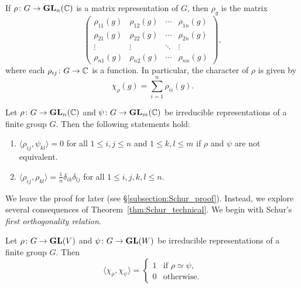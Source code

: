 If $\rho\colon G\to\mathbf{GL}_n(\mathbb{C})$ is a matrix representation of $G$, then
$\rho_g$ is the matrix
\[
\begin{pmatrix}
    \rho_{11}(g) & \rho_{12}(g) & \cdots & \rho_{1n}(g)\\
    \rho_{21}(g) & \rho_{22}(g) & \cdots & \rho_{2n}(g)\\
    \vdots & \vdots & \ddots & \vdots\\
    \rho_{n1}(g) & \rho_{n2}(g) & \cdots & \rho_{nn}(g)
\end{pmatrix},
\]
where each $\rho_{ij}\colon G\to\mathbb{C}$ is a function. 
In particular, the character of $\rho$ is given by
\[
\chi_\rho(g)=\sum_{i=1}^n\rho_{ii}(g).
\]


\begin{theorem}[Schur]
\label{thm:Schur_technical}
    Let $\rho\colon G\to\mathbf{GL}_n(\mathbb{C})$ and $\psi\colon G\to\mathbf{GL}_m(\mathbb{C})$ be irreducible representations of a finite group $G$. 
    Then the following statements hold:
    \begin{enumerate}
        \item $\langle\rho_{ij},\psi_{kl}\rangle=0$ for all $1\leq i,j\leq n$ and $1\leq k,l\leq m$ if $\rho$ and $\psi$ are not equivalent.
        \item $\displaystyle{\langle\rho_{ij},\rho_{kl}\rangle=\frac{1}{n}\delta_{ik}\delta_{lj}}$ 
        for all $1\leq i,j,k,l\leq n$.
    \end{enumerate}
\end{theorem}

We leave the proof for later (see \S\ref{subsection:Schur_proof}). Instead, we explore several consequences of Theorem~\ref{thm:Schur_technical}. 
We begin with Schur's \emph{first orthogonality relation}.

\begin{theorem}[Schur]
\label{thm:Schur}
Let $\rho\colon G\to\mathbf{GL}(V)$ and $\psi\colon G\to\mathbf{GL}(W)$ be irreducible representations of a finite group $G$. Then
\[
\langle\chi_\rho,\chi_\psi\rangle=
\begin{cases}
1 & \text{if $\rho\simeq\psi$,}\\
0 & \text{otherwise.}
\end{cases}
\]
\end{theorem}

